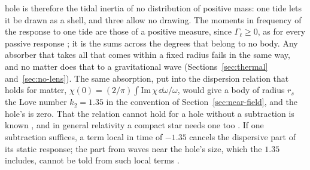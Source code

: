 hole is therefore the tidal inertia of no distribution of positive mass: one
tide lets it be drawn as a shell, and three allow no drawing. The moments in
frequency of the response to one tide are those of a positive measure, since
$\Gamma_\ell \ge 0$, as for every passive response \cite{KehagiasRiotto2026}; it is the sums across the degrees that belong to no
body. Any absorber
that takes all that comes within a fixed radius fails in the same way, and no
matter does that to a gravitational wave (Sections~\ref{sec:thermal}
and~\ref{sec:no-lens}).
The same absorption, put into the dispersion relation that holds for matter,
$\chi(0) = (2/\pi)\int\mathrm{Im}\,\chi\,\dd\omega/\omega$, would give a body
of radius $r_s$ the Love number $k_2 = 1.35$ in the convention of Section~\ref{sec:near-field}, and the hole's is zero. That the
relation cannot hold for a hole without a subtraction is known
\cite{Porto2016,KehagiasRiotto2026}, and in general relativity a compact star
needs one too \cite{McLoughlinSolon2026}. If one subtraction suffices, a term local
in time of $-1.35$ cancels the dispersive part of its static response; the part
from waves near the hole's size, which the $1.35$ includes, cannot be
told from such local terms \cite{GoldbergerLiRothstein2021}.


